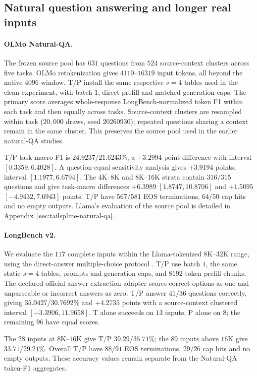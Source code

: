 \subsection{Natural question answering and longer real inputs}
\label{sec:natural-transfer-new}
\paragraph{OLMo Natural-QA.}
The frozen source pool has $631$ questions from $524$ source-context clusters
across five tasks. OLMo retokenization gives $4110$--$16319$ input tokens,
all beyond the native $4096$ window. T/P install the same respective $s=4$
tables used in the clean experiment, with batch $1$, direct prefill and
matched generation caps. The primary score averages whole-response
LongBench-normalized token F1 within each task and then equally across tasks.
Source-context clusters are resampled within task ($20{,}000$ draws, seed
$20260930$); repeated questions sharing a context remain in the same cluster.
This preserves the source pool used in the earlier natural-QA studies.

T/P task-macro F1 is $24.9237/21.6243\%$, a $+3.2994$-point difference with
interval $[0.3359,6.4028]$. A question-equal sensitivity analysis gives
$+3.9194$ points, interval $[1.1977,6.6794]$. The $4$K--$8$K and
$8$K--$16$K strata contain $316/315$ questions and give task-macro
differences $+6.3989$ $[1.8747,10.8706]$ and $+1.5095$
$[-4.9432,7.6943]$ points. T/P have $567/581$ EOS terminations,
$64/50$ cap hits and no empty outputs. Llama's evaluation of the source pool
is detailed in Appendix~\ref{sec:tailspline-natural-qa}.

\paragraph{LongBench v2.}
We evaluate the $117$ complete inputs within the Llama-tokenized $8$K--$32$K
range, using the direct-answer multiple-choice protocol
\citep{bai2025longbenchv2}. T/P use batch $1$, the same static $s=4$ tables,
prompts and generation caps, and $8192$-token prefill chunks.
The declared official answer-extraction adapter scores correct options as one
and unparseable or incorrect answers as zero. T/P answer $41/36$ questions
correctly, giving $35.0427/30.7692\%$ and $+4.2735$ points with a
source-context clustered interval $[-3.3906,11.9658]$. T alone succeeds on
$13$ inputs, P alone on $8$; the remaining $96$ have equal scores.

The $28$ inputs at $8$K--$16$K give T/P $39.29/35.71\%$; the $89$ inputs
above $16$K give $33.71/29.21\%$. Overall T/P have $88/91$ EOS terminations,
$29/26$ cap hits and no empty outputs. These accuracy values remain separate
from the Natural-QA token-F1 aggregates.
\FloatBarrier

